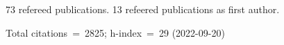 73 refereed publications. 13 refeered publications as first author.

Total citations~=~2825; h-index~=~29 (2022-09-20)